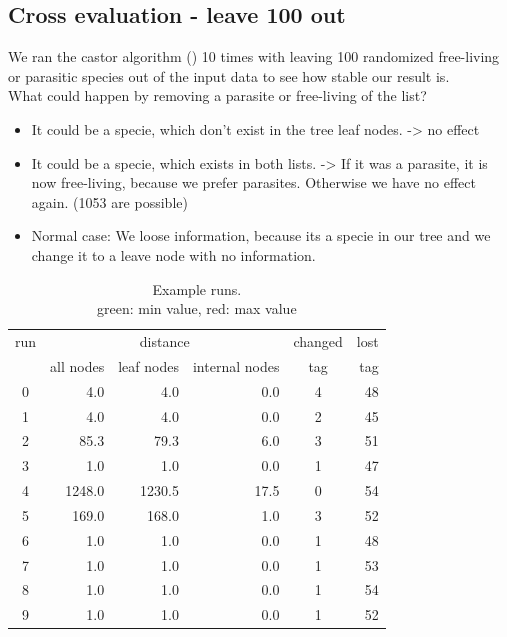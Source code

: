     \subsection{Cross evaluation - leave 100 out}
      We ran the castor algorithm () 10 times with leaving 100 randomized free-living or 
        parasitic species out of the input data to see how stable our result is. \\
      What could happen by removing a parasite or free-living of the list?
      \begin{itemize}
        \item It could be a specie, which don't exist in the tree leaf nodes. -> no effect
        \item It could be a specie, which exists in both lists. -> If it was a parasite, it is now 
          free-living, because we prefer parasites. Otherwise we have no effect again. (1053 are possible)
        \item Normal case: We loose information, because its a specie in our tree and we change it to a 
          leave node with no information.
      \end{itemize}
      \begin{table}
        \begin{center}
          \begin{tabular}{ |c||r|r|r||c|r| }
            \hline
            run & \multicolumn{3}{c||}{distance} & changed & lost \\
            & all nodes & leaf nodes & internal nodes & tag & tag \\
            \hline \hline
            0 & 4.0 & 4.0 & 0.0 & 4 & 48 \\
            1 & 4.0 & 4.0 & 0.0 & 2 & \cellcolor{green!50}45 \\
            2 & 85.3 & 79.3 & 6.0 & 3 & 51 \\
            3 & 1.0 & 1.0 & 0.0 & 1 & 47 \\
            \rowcolor{red!50}4 & 1248.0 & 1230.5 & 17.5 & \cellcolor{green!50}0 & 54 \\
            5 & 169.0 & 168.0 & 1.0 & 3 & 52 \\
            6 & 1.0 & 1.0 & 0.0 & 1 & 48 \\
            7 & 1.0 & 1.0 & 0.0 & 1 & 53 \\
            8 & 1.0 & 1.0 & 0.0 & 1 & \cellcolor{red!50}54 \\
            9 & 1.0 & 1.0 & 0.0 & 1 & 52 \\
            \hline
          \end{tabular}
        \end{center}
        \caption{Example runs. \\ green: min value, red: max value}
      \end{table}

